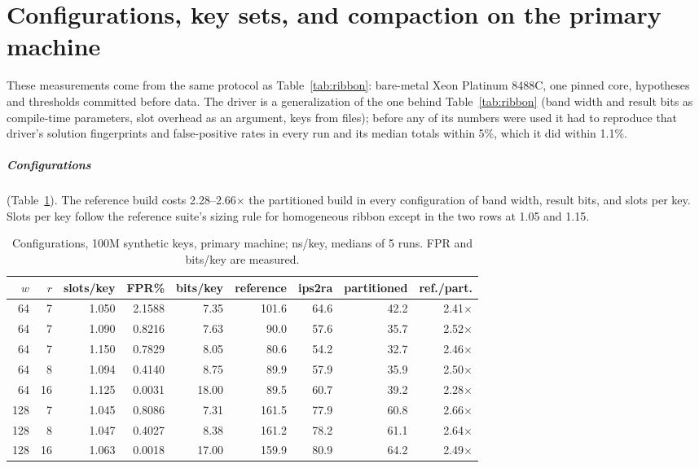 \documentclass[a4paper,UKenglish,cleveref,autoref,thm-restate,anonymous]{lipics-v2021}
\begin{document}
\section{Configurations, key sets, and compaction on the primary machine}\label{app:eseven}
These measurements come from the same protocol as Table~\ref{tab:ribbon}: bare-metal Xeon
Platinum 8488C, one pinned core, hypotheses and thresholds committed before data. The driver is
a generalization of the one behind Table~\ref{tab:ribbon} (band width and result bits as
compile-time parameters, slot overhead as an argument, keys from files); before any of its
numbers were used it had to reproduce that driver's solution fingerprints and false-positive
rates in every run and its median totals within 5\%, which it did within 1.1\%.

\subparagraph*{Configurations} (Table~\ref{tab:esevenconfig}). The reference build costs
2.28--2.66$\times$ the partitioned build in every configuration of band
width, result bits, and slots per key. Slots per key follow the reference suite's sizing rule
for homogeneous ribbon except in the two rows at 1.05 and 1.15.

\begin{table}
\caption{Configurations, 100M synthetic keys, primary machine; ns/key, medians of 5 runs.
FPR and bits/key are measured.}
\label{tab:esevenconfig}
\small\setlength{\tabcolsep}{3.5pt}
\begin{tabular}{rrrrrrrrr}
\toprule
$w$ & $r$ & slots/key & FPR\% & bits/key & reference & ips2ra & partitioned & ref./part. \\
\midrule
64 & 7 & 1.050 & 2.1588 & 7.35 & 101.6 & 64.6 & 42.2 & 2.41$\times$ \\
64 & 7 & 1.090 & 0.8216 & 7.63 & 90.0 & 57.6 & 35.7 & 2.52$\times$ \\
64 & 7 & 1.150 & 0.7829 & 8.05 & 80.6 & 54.2 & 32.7 & 2.46$\times$ \\
64 & 8 & 1.094 & 0.4140 & 8.75 & 89.9 & 57.9 & 35.9 & 2.50$\times$ \\
64 & 16 & 1.125 & 0.0031 & 18.00 & 89.5 & 60.7 & 39.2 & 2.28$\times$ \\
128 & 7 & 1.045 & 0.8086 & 7.31 & 161.5 & 77.9 & 60.8 & 2.66$\times$ \\
128 & 8 & 1.047 & 0.4027 & 8.38 & 161.2 & 78.2 & 61.1 & 2.64$\times$ \\
128 & 16 & 1.063 & 0.0018 & 17.00 & 159.9 & 80.9 & 64.2 & 2.49$\times$ \\
\bottomrule
\end{tabular}
\end{table}
\end{document}
